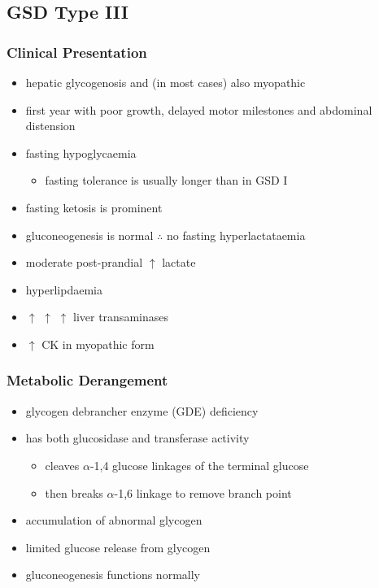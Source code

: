 \documentclass{scrartcl}
\begin{document}
\subsection{GSD Type III}
\label{sec:orgbfacc10}
\subsubsection{Clinical Presentation}
\label{sec:orgd0cff58}
\begin{itemize}
\item hepatic glycogenosis and (in most cases) also myopathic
\item first year with poor growth, delayed motor milestones and abdominal
distension
\item fasting hypoglycaemia 
\begin{itemize}
\item fasting tolerance is usually longer than in GSD I
\end{itemize}
\item fasting ketosis is prominent
\item gluconeogenesis is normal \(\therefore\) no fasting hyperlactataemia
\item moderate post-prandial \(\uparrow\) lactate
\item hyperlipdaemia
\item \(\uparrow\) \(\uparrow\) \(\uparrow\) liver transaminases
\item \(\uparrow\) CK in myopathic form
\end{itemize}
\subsubsection{Metabolic Derangement}
\label{sec:org91fb5cf}
\begin{itemize}
\item glycogen debrancher enzyme (GDE) deficiency
\item has both glucosidase and transferase activity
\begin{itemize}
\item cleaves \(\alpha\)-1,4 glucose linkages of the terminal glucose
\item then breaks \(\alpha\)-1,6 linkage to remove branch point
\end{itemize}
\item accumulation of abnormal glycogen
\item limited glucose release from glycogen
\item gluconeogenesis functions normally
\end{itemize}
\end{document}
